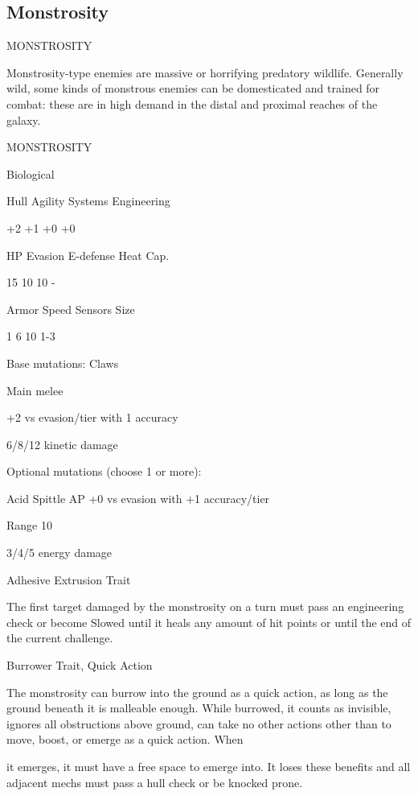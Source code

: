 \subsection{Monstrosity}
                                           MONSTROSITY

Monstrosity-type enemies are massive or horrifying predatory wildlife. Generally wild, some kinds
of monstrous enemies can be domesticated and trained for combat: these are in high demand in
the distal and proximal reaches of the galaxy.


       MONSTROSITY

       Biological

       Hull       Agility      Systems       Engineering

       +2         +1           +0            +0

       HP         Evasion      E-defense     Heat Cap.

       15         10           10            -

       Armor      Speed        Sensors       Size

       1          6            10            1-3

Base mutations:
Claws

Main melee

+2 vs evasion/tier with 1 accuracy

6/8/12 kinetic damage


Optional mutations (choose 1 or more):


Acid Spittle
AP
+0 vs evasion with +1 accuracy/tier

Range 10

3/4/5 energy damage


Adhesive Extrusion
Trait

The first target damaged by the monstrosity on a turn must pass an engineering check or
become Slowed until it heals any amount of hit points or until the end of the current challenge.


Burrower
Trait, Quick Action

The monstrosity can burrow into the ground as a quick action, as long as the ground beneath it
is malleable enough. While burrowed, it counts as invisible, ignores all obstructions above
ground, can take no other actions other than to move, boost, or emerge as a quick action. When




it emerges, it must have a free space to emerge into. It loses these benefits and all adjacent
mechs must pass a hull check or be knocked prone.


